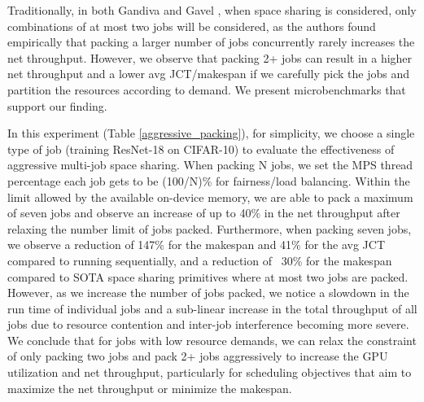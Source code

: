 \documentclass{article}
\begin{document}
Traditionally, in both Gandiva \cite{gandiva} and Gavel \cite{gavel}, when space sharing is considered, only  combinations of at most two jobs will be considered, as the authors found empirically that packing a larger number of jobs concurrently rarely increases the net throughput. However, we observe that packing 2+ jobs can result in a higher net throughput and a lower avg JCT/makespan if we carefully pick the jobs and partition the resources according to demand. We present microbenchmarks that support our finding.

In this experiment (Table \ref{aggressive_packing}), for simplicity, we choose a single type of job (training ResNet-18 on CIFAR-10) to evaluate the effectiveness of aggressive multi-job space sharing. When packing N jobs, we set the MPS thread percentage each job gets to be (100/N)\% for fairness/load balancing. Within the limit allowed by the available on-device memory, we are able to pack a maximum of seven jobs and observe an increase of up to 40\% in the net throughput after relaxing the number limit of jobs packed. Furthermore, when packing seven jobs, we observe a reduction of 147\% for the makespan and 41\% for the avg JCT compared to running sequentially, and a reduction of ~30\% for the makespan compared to SOTA space sharing primitives where at most two jobs are packed. However, as we increase the number of jobs packed, we notice a slowdown in the run time of individual jobs and a sub-linear increase in the total throughput of all jobs due to resource contention and inter-job interference becoming more severe. We conclude that for jobs with low resource demands, we can relax the constraint of only packing two jobs and pack 2+ jobs aggressively to increase the GPU utilization and net throughput, particularly for scheduling objectives that aim to maximize the net throughput or minimize the makespan.



\end{document}
